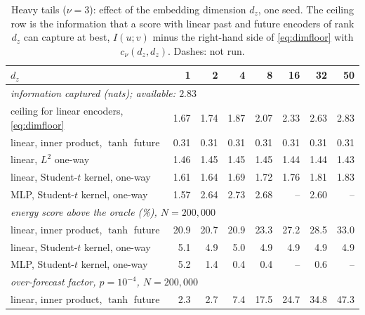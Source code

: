 \documentclass[11pt]{article}
\theoremstyle{plain}
\theoremstyle{definition}
\theoremstyle{remark}
\begin{document}
\begin{table}[ht]
 \centering
 \footnotesize
 \setlength{\tabcolsep}{4pt}
 \begin{tabular}{lrrrrrrr}
  \toprule
  $d_z$ & 1 & 2 & 4 & 8 & 16 & 32 & 50 \\
  \midrule
  \multicolumn{8}{l}{\emph{information captured (nats); available: $2.83$}} \\
  ceiling for linear encoders, \eqref{eq:dimfloor} & 1.67 & 1.74 & 1.87 & 2.07 & 2.33 & 2.63 & 2.83 \\
  linear, inner product, $\tanh$ future & 0.31 & 0.31 & 0.31 & 0.31 & 0.31 & 0.31 & 0.31 \\
  linear, $L^2$ one-way & 1.46 & 1.45 & 1.45 & 1.45 & 1.44 & 1.44 & 1.43 \\
  linear, Student-$t$ kernel, one-way & 1.61 & 1.64 & 1.69 & 1.72 & 1.76 & 1.81 & 1.83 \\
  MLP, Student-$t$ kernel, one-way & 1.57 & 2.64 & 2.73 & 2.68 & -- & 2.60 & -- \\
  \midrule
  \multicolumn{8}{l}{\emph{energy score above the oracle (\%), $N=200{,}000$}} \\
  linear, inner product, $\tanh$ future & 20.9 & 20.7 & 20.9 & 23.3 & 27.2 & 28.5 & 33.0 \\
  linear, Student-$t$ kernel, one-way & 5.1 & 4.9 & 5.0 & 4.9 & 4.9 & 4.9 & 4.9 \\
  MLP, Student-$t$ kernel, one-way & 5.2 & 1.4 & 0.4 & 0.4 & -- & 0.6 & -- \\
  \midrule
  \multicolumn{8}{l}{\emph{over-forecast factor, $p=10^{-4}$, $N=200{,}000$}} \\
  linear, inner product, $\tanh$ future & 2.3 & 2.7 & 7.4 & 17.5 & 24.7 & 34.8 & 47.3 \\
  \bottomrule
 \end{tabular}
 \caption{Heavy tails ($\nu=3$): effect of the embedding dimension $d_z$,
  one seed. The ceiling row is the information that a score with linear past
  and future encoders of rank $d_z$ can capture at best,
  $I(u;v)$ minus the right-hand side of \eqref{eq:dimfloor} with
  $c_\nu(d_z,d_z)$. Dashes: not run.}
 \label{tab:dimsweep}
\end{table}
\end{document}
